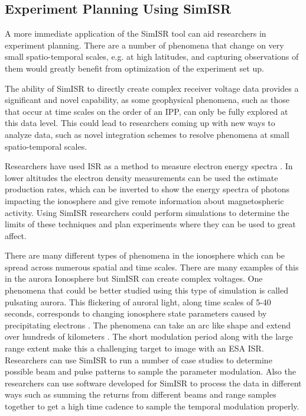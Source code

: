 \subsection{Experiment Planning Using SimISR}

A more immediate application of the SimISR tool can aid researchers in experiment planning. There are a number of phenomena that change on very small spatio-temporal scales, e.g. at high latitudes, and capturing observations of them would greatly benefit from optimization of the experiment set up. 

The ability of SimISR to directly create complex receiver voltage data provides a significant and novel capability, as some geophysical phenomena, such as those that occur at time scales on the order of an IPP, can only be fully explored at this data level. This could lead to researchers coming up with new ways to analyze data, such as novel integration schemes to resolve phenomena at small spatio-temporal scales.

Researchers have used ISR as a method to measure electron energy spectra \cite{Semeter:2005foa}. In lower altitudes the electron density measurements can be used the estimate production rates, which can be inverted to show the energy spectra of photons impacting the ionosphere and give remote information about magnetospheric activity. Using SimISR researchers could perform simulations to determine the limits of these techniques and plan experiments where they can be used to great affect.

There are many different types of phenomena in the ionosphere which can be spread across numerous spatial and time scales. There are many examples of this in the aurora Ionosphere but SimISR can create complex voltages. One phenomena that could be better studied using this type of simulation is called pulsating aurora. This flickering of auroral light, along time scales of 5-40 seconds, corresponds to changing ionosphere state parameters caused by precipitating electrons \cite{JGRA:JGRA21510}. The phenomena can take an arc like shape and extend over hundreds of kilometers \cite{JGRA:JGRA20202}. The short modulation period along with the large range extent make this a challenging target to image with an ESA ISR. Researchers can use SimISR to run a number of case studies to determine possible beam and pulse patterns to sample the parameter modulation. Also the researchers can use software developed for SimISR to process the data in different ways such as summing the returns from different beams and range samples together to get a high time cadence to sample the temporal modulation properly. 



